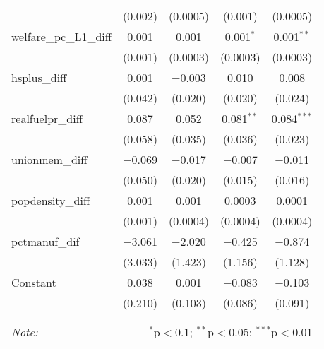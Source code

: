 \begin{table}[!htbp]
\begin{tabular}{@{\extracolsep{5pt}}lcccc}
  & (0.002) & (0.0005) & (0.001) & (0.0005) \\ 
  welfare\_pc\_L1\_diff & 0.001 & 0.001 & 0.001$^{*}$ & 0.001$^{**}$ \\ 
  & (0.001) & (0.0003) & (0.0003) & (0.0003) \\ 
  hsplus\_diff & 0.001 & $-$0.003 & 0.010 & 0.008 \\ 
  & (0.042) & (0.020) & (0.020) & (0.024) \\ 
  realfuelpr\_diff & 0.087 & 0.052 & 0.081$^{**}$ & 0.084$^{***}$ \\ 
  & (0.058) & (0.035) & (0.036) & (0.023) \\ 
  unionmem\_diff & $-$0.069 & $-$0.017 & $-$0.007 & $-$0.011 \\ 
  & (0.050) & (0.020) & (0.015) & (0.016) \\ 
  popdensity\_diff & 0.001 & 0.001 & 0.0003 & 0.0001 \\ 
  & (0.001) & (0.0004) & (0.0004) & (0.0004) \\ 
  pctmanuf\_dif & $-$3.061 & $-$2.020 & $-$0.425 & $-$0.874 \\ 
  & (3.033) & (1.423) & (1.156) & (1.128) \\ 
  Constant & 0.038 & 0.001 & $-$0.083 & $-$0.103 \\ 
  & (0.210) & (0.103) & (0.086) & (0.091) \\ 
 \hline \\[-1.8ex] 
\hline 
\hline \\[-1.8ex] 
\textit{Note:}  & \multicolumn{4}{r}{$^{*}$p$<$0.1; $^{**}$p$<$0.05; $^{***}$p$<$0.01} \\ 
\end{tabular} 
\end{table} 
